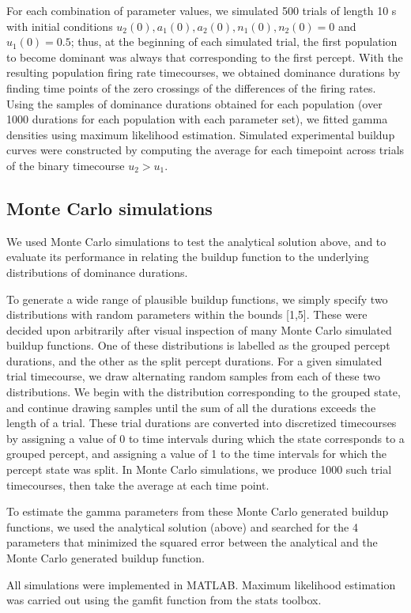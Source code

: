 For each combination of parameter values, we simulated 500 trials of length 10 s with initial conditions $u_2(0), a_1(0), a_2(0), n_1(0), n_2(0) = 0$ and $u_1(0) = 0.5$; thus, at the beginning of each simulated trial, the first population to become dominant was always that corresponding to the first percept. With the resulting population firing rate timecourses, we obtained dominance durations by finding time points of the zero crossings of the differences of the firing rates. Using the samples of dominance durations obtained for each population (over 1000 durations for each population with each parameter set), we fitted gamma densities using maximum likelihood estimation. Simulated experimental buildup curves were constructed by computing the average for each timepoint across trials of the binary timecourse $u_2 > u_1$. 


\subsection{Monte Carlo simulations}

We used Monte Carlo simulations to test the analytical solution above, and to evaluate its performance in relating the buildup function to the underlying distributions of dominance durations.

To generate a wide range of plausible buildup functions, we simply specify two distributions with random parameters within the bounds [1,5]. These were decided upon arbitrarily after visual inspection of many Monte Carlo simulated buildup functions. One of these distributions is labelled as the grouped percept durations, and the other as the split percept durations. For a given simulated trial timecourse, we draw alternating random samples from each of these two distributions. We begin with the distribution corresponding to the grouped state, and continue drawing samples until the sum of all the durations exceeds the length of a trial. These trial durations are converted into discretized timecourses by assigning a value of 0 to time intervals during which the state corresponds to a grouped percept, and assigning a value of 1 to the time intervals for which the percept state was split. In Monte Carlo simulations, we produce 1000 such trial timecourses, then take the average at each time point.

To estimate the gamma parameters from these Monte Carlo generated buildup functions, we used the analytical solution (above) and searched for the 4 parameters that minimized the squared error between the analytical and the Monte Carlo generated buildup function. 

All simulations were implemented in MATLAB. Maximum likelihood estimation was carried out using the gamfit function from the stats toolbox. 





